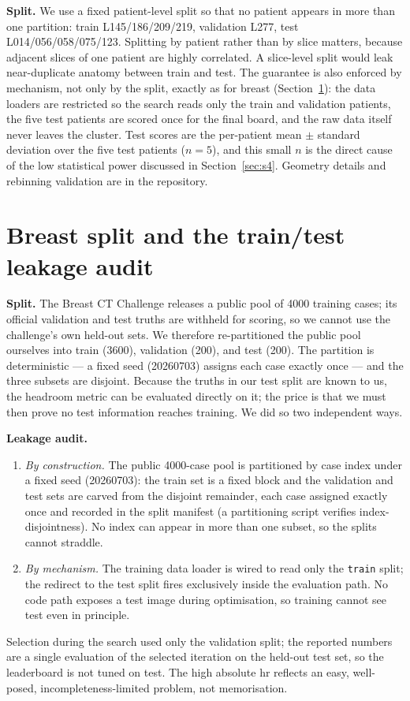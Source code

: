 \documentclass[AMA,twocolumn]{USG}
\begin{document}
\textbf{Split.} We use a fixed patient-level split so that no patient appears in more than one partition: train L145/186/209/219, validation L277, test L014/056/058/075/123. Splitting by patient rather than by slice matters, because adjacent slices of one patient are highly correlated. A slice-level split would leak near-duplicate anatomy between train and test. The guarantee is also enforced by mechanism, not only by the split, exactly as for breast (Section~\ref{sec:s3}): the data loaders are restricted so the search reads only the train and validation patients, the five test patients are scored once for the final board, and the raw data itself never leaves the cluster. Test scores are the per-patient mean $\pm$ standard deviation over the five test patients ($n=5$), and this small $n$ is the direct cause of the low statistical power discussed in Section~\ref{sec:s4}. Geometry details and rebinning validation are in the repository.


\section{Breast split and the train/test leakage audit}\label{sec:s3}

\textbf{Split.} The Breast CT Challenge releases a public pool of 4000 training cases; its official validation and test truths are withheld for scoring, so we cannot use the challenge's own held-out sets. We therefore re-partitioned the public pool ourselves into train (3600), validation (200), and test (200). The partition is deterministic --- a fixed seed (20260703) assigns each case exactly once --- and the three subsets are disjoint. Because the truths in our test split are known to us, the headroom metric can be evaluated directly on it; the price is that we must then prove no test information reaches training. We did so two independent ways.

\textbf{Leakage audit.}
\begin{enumerate}
\item \emph{By construction.} The public 4000-case pool is partitioned by case index under a fixed seed (20260703): the train set is a fixed block and the validation and test sets are carved from the disjoint remainder, each case assigned exactly once and recorded in the split manifest (a partitioning script verifies index-disjointness). No index can appear in more than one subset, so the splits cannot straddle.
\item \emph{By mechanism.} The training data loader is wired to read only the \texttt{train} split; the redirect to the test split fires exclusively inside the evaluation path. No code path exposes a test image during optimisation, so training cannot see test even in principle.
\end{enumerate}
Selection during the search used only the validation split; the reported numbers are a single evaluation of the selected iteration on the held-out test set, so the leaderboard is not tuned on test. The high absolute hr reflects an easy, well-posed, incompleteness-limited problem, not memorisation.
\end{document}
